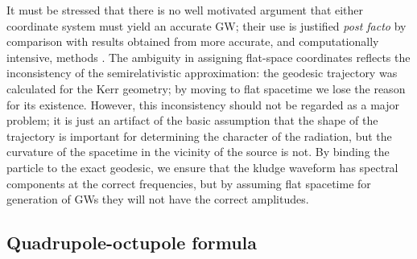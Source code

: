 \documentclass[useAMS,usedcolumn,usegraphicx,usenatbib]{mn2e}
\begin{document}
It must be stressed that there is no well motivated argument that either coordinate system must yield an accurate GW; their use is justified {\it post facto} by comparison with results obtained from more accurate, and computationally intensive, methods \citep{Gair2005, Babak2007}. The ambiguity in assigning flat-space coordinates reflects the inconsistency of the semirelativistic approximation: the geodesic trajectory was calculated for the Kerr geometry; by moving to flat spacetime we lose the reason for its existence. However, this inconsistency should not be regarded as a major problem; it is just an artifact of the basic assumption that the shape of the trajectory is important for determining the character of the radiation, but the curvature of the spacetime in the vicinity of the source is not. By binding the particle to the exact geodesic, we ensure that the kludge waveform has spectral components at the correct frequencies, but by assuming flat spacetime for generation of GWs they will not have the correct amplitudes.

\subsection{Quadrupole-octupole formula}
\end{document}
